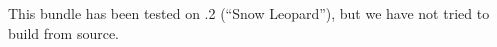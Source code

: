 This bundle has been tested on .2 (``Snow Leopard''), but we have not tried to build from source.

% 
% 
